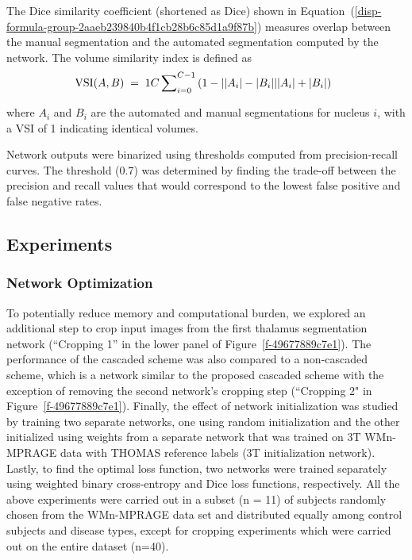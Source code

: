 The Dice similarity coefficient (shortened as Dice) shown in Equation~(\ref{disp-formula-group-2aaeb239840b4f1cb28b6c85d1a9f87b})  measures overlap between the manual segmentation and the automated segmentation computed by the network. The volume similarity index is defined as 
\let\saveeqnno\theequation
\let\savefrac\frac
\def\dispfrac{\displaystyle\savefrac}
\begin{eqnarray}
\let\frac\dispfrac
\gdef\theequation{4}
\let\theHequation\theequation
\label{disp-formula-group-2a067b4f3fd04fa9843b3e7ae057d0e6}
\begin{array}{@{}l}\text{VSI}(A,B)\;=\;\frac1C\sum\nolimits_{i=0}^{C-1}\left(1-\frac{\left\vert \left\vert A_i\right\vert-\left\vert B_i\right\vert\right\vert}{\left\vert A_i\right\vert+\left\vert B_i\right\vert}\right)\end{array}
\end{eqnarray}
\global\let\theequation\saveeqnno
\addtocounter{equation}{-1}\ignorespaces 
where $A_i $ and $B_i $ are the automated and manual segmentations for nucleus $i $, with a VSI of 1 indicating identical volumes. 

Network outputs were binarized using thresholds computed from precision-recall curves. The threshold (0.7) was determined by finding the trade-off between the precision and recall values that would correspond to the lowest false positive and false negative rates. 



\subsection{Experiments}



\subsubsection{Network Optimization} To potentially reduce memory and computational burden, we explored an additional step to crop input images from the first thalamus segmentation network (``Cropping 1'' in the lower panel of Figure~\ref{f-49677889c7e1}). The performance of the cascaded scheme was also compared to a non-cascaded scheme, which is a network similar to the proposed cascaded scheme with the exception of removing the second network's cropping step (``Cropping 2" in Figure~\ref{f-49677889c7e1}). Finally, the effect of network initialization was studied by training two separate networks, one using random initialization and the other initialized using weights from a separate network that was trained on 3T WMn-MPRAGE data with THOMAS reference labels (3T initialization network). Lastly, to find the optimal loss function, two networks were trained separately using weighted binary cross-entropy and Dice loss functions, respectively. All the above experiments were carried out in a subset (n = 11) of subjects randomly chosen from the WMn-MPRAGE data set and distributed equally among control subjects and disease types, except for cropping experiments which were carried out on the entire dataset (n=40).



